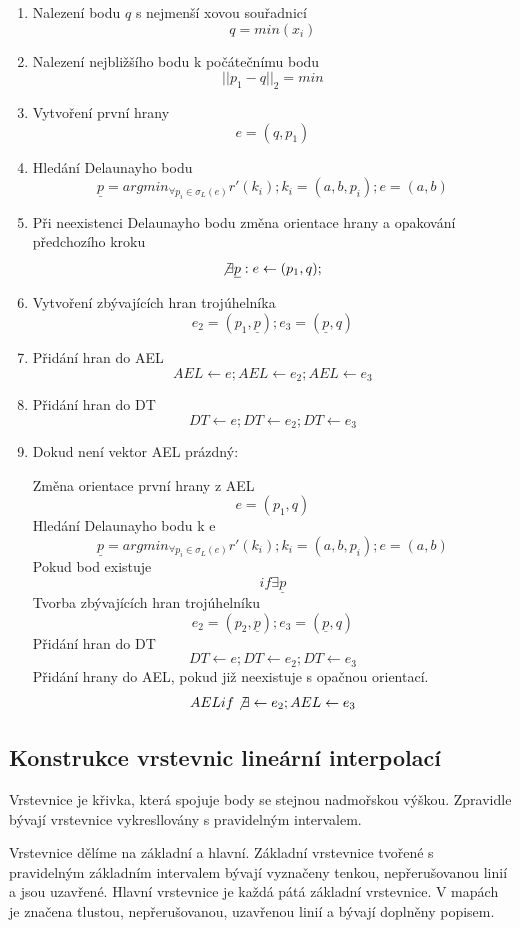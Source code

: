 \documentclass[11pt]{article}
\begin{document}
 \begin{enumerate}
 \item Nalezení bodu $q$ s nejmenší xovou souřadnicí 
 $$ q = min(x_i) $$ 
 \item Nalezení nejbližšího bodu k počátečnímu bodu 
 $$ ||p_1 - q||_2 = min  $$
 \item Vytvoření první hrany 
 $$ e = (q, p_1) $$
 \item Hledání Delaunayho bodu 
 $$ \underline{p} = argmin_{\forall p_i \in \sigma_L (e)} r'(k_i); k_i = (a, b, p_i); e = (a, b)$$
 \item Při neexistenci Delaunayho bodu změna orientace hrany a opakování předchozího kroku
 $$ \not\exists \underline{p} : e \leftarrow (p_1, q);$$
 
 \item Vytvoření zbývajících hran trojúhelníka 
 $$ e_2 = (p_1,  \underline{p}); e_3 = ( \underline{p} , q) $$
 \item Přidání hran do AEL 
 $$ AEL \leftarrow e; AEL \leftarrow e_2; AEL \leftarrow e_3  $$  
 \item Přidání hran do DT  
 $$ DT \leftarrow e; DT \leftarrow e_2; DT \leftarrow e_3  $$
 \item Dokud není vektor AEL prázdný: 
 
		Změna orientace první hrany z AEL
	$$ e = (p_1, q) $$
		Hledání Delaunayho bodu k e 
	$$ \underline{p} = argmin_{\forall p_i \in \sigma_L (e)} r'(k_i); k_i = (a, b, p_i); e = (a, b)$$ 
		Pokud bod existuje 
	$$ if \exists  \underline{p}$$
		Tvorba zbývajících hran trojúhelníku 
		$$ e_2 = (p_2,  \underline{p}); e_3 = ( \underline{p} , q) $$
		Přidání hran do DT 
		$$ DT \leftarrow e; DT \leftarrow e_2; DT \leftarrow e_3  $$
		Přidání hrany do AEL, pokud již neexistuje s opačnou orientací.
		$$AEL if \not\exists \leftarrow e_2; AEL \leftarrow e_3  $$ 
 \end{enumerate}


\subsection{Konstrukce vrstevnic lineární interpolací}
Vrstevnice je  křivka, která spojuje body se stejnou nadmořskou výškou. Zpravidle bývají vrstevnice vykresllovány s pravidelným intervalem.

Vrstevnice dělíme na základní a hlavní. Základní vrstevnice tvořené s pravidelným základním intervalem bývají vyznačeny tenkou, nepřerušovanou linií a jsou uzavřené. Hlavní vrstevnice je každá pátá základní vrstevnice. V mapách je značena tlustou, nepřerušovanou, uzavřenou linií a bývají doplněny popisem.
\end{document}
